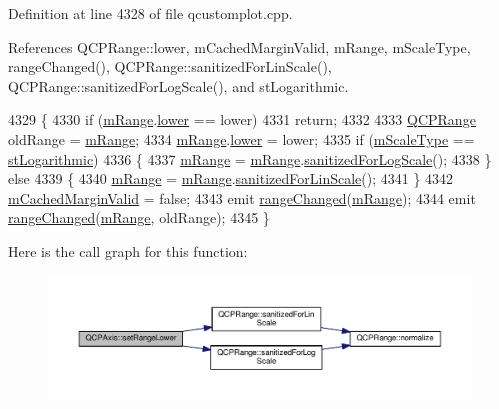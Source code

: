 Definition at line 4328 of file qcustomplot.\+cpp.



References Q\+C\+P\+Range\+::lower, m\+Cached\+Margin\+Valid, m\+Range, m\+Scale\+Type, range\+Changed(), Q\+C\+P\+Range\+::sanitized\+For\+Lin\+Scale(), Q\+C\+P\+Range\+::sanitized\+For\+Log\+Scale(), and st\+Logarithmic.


\begin{DoxyCode}
4329 \{
4330   \textcolor{keywordflow}{if} (\hyperlink{class_q_c_p_axis_a1ee36773c49062d751560e11f90845f7}{mRange}.\hyperlink{class_q_c_p_range_aa3aca3edb14f7ca0c85d912647b91745}{lower} == lower)
4331     \textcolor{keywordflow}{return};
4332   
4333   \hyperlink{class_q_c_p_range}{QCPRange} oldRange = \hyperlink{class_q_c_p_axis_a1ee36773c49062d751560e11f90845f7}{mRange};
4334   \hyperlink{class_q_c_p_axis_a1ee36773c49062d751560e11f90845f7}{mRange}.\hyperlink{class_q_c_p_range_aa3aca3edb14f7ca0c85d912647b91745}{lower} = lower;
4335   \textcolor{keywordflow}{if} (\hyperlink{class_q_c_p_axis_ad706039549cbbbec5fcb2baf7894e04d}{mScaleType} == \hyperlink{class_q_c_p_axis_a36d8e8658dbaa179bf2aeb973db2d6f0abf5b785ad976618816dc6f79b73216d4}{stLogarithmic})
4336   \{
4337     \hyperlink{class_q_c_p_axis_a1ee36773c49062d751560e11f90845f7}{mRange} = \hyperlink{class_q_c_p_axis_a1ee36773c49062d751560e11f90845f7}{mRange}.\hyperlink{class_q_c_p_range_aaf6a9046e78d91eeb8e89584fe46b034}{sanitizedForLogScale}();
4338   \} \textcolor{keywordflow}{else}
4339   \{
4340     \hyperlink{class_q_c_p_axis_a1ee36773c49062d751560e11f90845f7}{mRange} = \hyperlink{class_q_c_p_axis_a1ee36773c49062d751560e11f90845f7}{mRange}.\hyperlink{class_q_c_p_range_a1ff029704c29a75adbc1dc36cecaf44c}{sanitizedForLinScale}();
4341   \}
4342   \hyperlink{class_q_c_p_axis_a2cde37b6e385f47e11322df4ac1b0e9b}{mCachedMarginValid} = \textcolor{keyword}{false};
4343   emit \hyperlink{class_q_c_p_axis_a0894084e4c16a1736534c4095746f910}{rangeChanged}(\hyperlink{class_q_c_p_axis_a1ee36773c49062d751560e11f90845f7}{mRange});
4344   emit \hyperlink{class_q_c_p_axis_a0894084e4c16a1736534c4095746f910}{rangeChanged}(\hyperlink{class_q_c_p_axis_a1ee36773c49062d751560e11f90845f7}{mRange}, oldRange);
4345 \}
\end{DoxyCode}


Here is the call graph for this function\+:\nopagebreak
\begin{figure}[H]
\begin{center}
\leavevmode
\includegraphics[width=350pt]{class_q_c_p_axis_afcf51227d337db28d1a9ce9a4d1bc91a_cgraph}
\end{center}
\end{figure}


